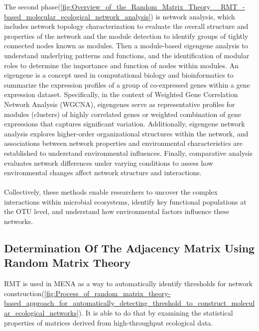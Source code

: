 The second phase(\autoref{fig:Overview_of_the_Random_Matrix_Theory__RMT_-based_molecular_ecological_network_analysis}) is network analysis, which includes network topology characterization to evaluate the overall structure and properties of the network and the module detection to identify groups of tightly connected nodes known as modules.
Then a module-based eigengene analysis to understand underlying patterns and functions, and the identification of modular roles to determine the importance and function of nodes within modules.
An eigengene is a concept used in computational biology and bioinformatics to summarize the expression profiles of a group of co-expressed genes within a gene expression dataset.
Specifically, in the context of Weighted Gene Correlation Network Analysis (WGCNA), eigengenes serve as representative profiles for modules (clusters) of highly correlated genes or weighted combination of gene expressions that captures significant variation.
Additionally, eigengene network analysis explores higher-order organizational structures within the network, and associations between network properties and environmental characteristics are established to understand environmental influences.
Finally, comparative analysis evaluates network differences under varying conditions to assess how environmental changes affect network structure and interactions.
\\\\
Collectively, these methods enable researchers to uncover the complex interactions within microbial ecosystems, identify key functional populations at the OTU level, and understand how environmental factors influence these networks.

\newpage
\subsection{Determination Of The Adjacency Matrix Using \mbox{Random} Matrix Theory}\label{subsec:determination-of-the-adjacency-matrix-using-random-matrix-theory}

RMT is used in MENA as a way to automatically identify thresholds for network construction(\autoref{fig:Process_of_random_matrix_theory-based_approach_for_automatically_detecting_threshold_to_construct_molecular_ecological_networks}).
It is able to do that by examining the statistical properties of matrices derived from high-throughput ecological data.

